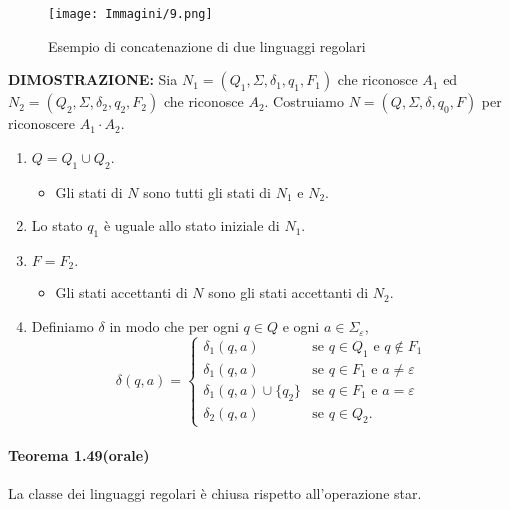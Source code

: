 \documentclass{article}
\begin{document}
\begin{figure}[H]
    \centering
    \texttt{[image: Immagini/9.png]}
    \caption{Esempio di concatenazione di due linguaggi regolari}
    \label{fig:concatenation_example1}
\end{figure}
\vspace{1em}

\textbf{DIMOSTRAZIONE:}
Sia $N_1 = (Q_1, \Sigma, \delta_1, q_1, F_1)$ che riconosce $A_1$ ed
$N_2 = (Q_2, \Sigma, \delta_2, q_2, F_2)$ che riconosce $A_2$.
Costruiamo $N = (Q, \Sigma, \delta, q_0, F)$ per riconoscere $A_1 \cdot A_2$.
\begin{enumerate}
    \item $Q = Q_1 \cup Q_2.$
        \begin{itemize}
            \item Gli stati di $N$ sono tutti gli stati di $N_1$ e $N_2$.
        \end{itemize}
    \item Lo stato $q_1$ è uguale allo stato iniziale di $N_1$.
    \item $F = F_2.$
        \begin{itemize}
            \item Gli stati accettanti di $N$ sono gli stati accettanti di $N_2$.
        \end{itemize}
    \item Definiamo $\delta$ in modo che per ogni $q \in Q$ e ogni $a \in \Sigma_\varepsilon$,
    \[
    \delta(q, a) =
    \begin{cases}
        \delta_1(q, a) & \text{se } q \in Q_1 \text{ e } q \notin F_1 \\
        \delta_1(q, a) & \text{se } q \in F_1 \text{ e } a \neq \varepsilon \\
        \delta_1(q, a) \cup \{q_2\} & \text{se } q \in F_1 \text{ e } a = \varepsilon \\
        \delta_2(q, a) & \text{se } q \in Q_2.
    \end{cases}
    \]
\end{enumerate}

\newpage
\paragraph{Teorema 1.49(orale)}
\text{  }
\begin{tcolorbox}[colback=orange!10!white, colframe=orange!50!black, title=Teorema 1.49 (orale)]
La classe dei linguaggi regolari è chiusa rispetto all'operazione star.
\end{tcolorbox}
\end{document}
